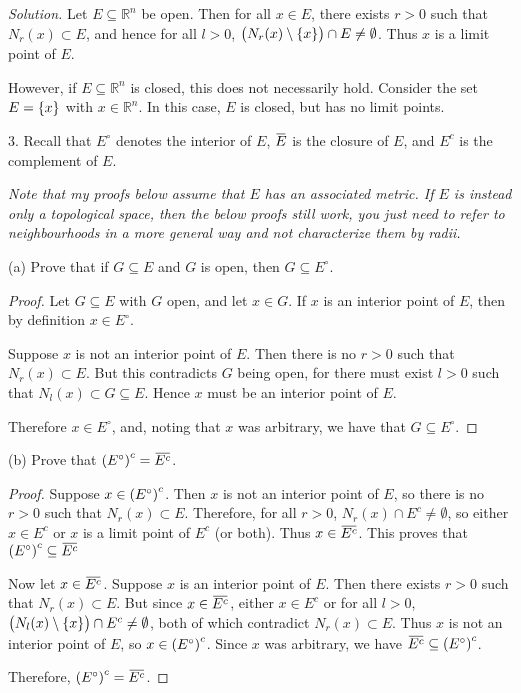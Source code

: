 \documentclass{article}
\newcommand{\R}{\mathbb{R}}
\newcommand*\clos[1]{\mkern 1.5mu\overline{\mkern-1.5mu#1\mkern-1.5mu}\mkern 1.5mu}
\begin{document}
\textit{Solution.}
Let $E \subseteq \R^n$ be open. Then for all $x \in E$, there exists $r
> 0$ such that $N_r(x) \subset E$, and hence for all $l > 0$,
$\del{N_r(x) \setminus \cbr{x}} \cap E \neq \emptyset$. Thus $x$ is a
limit point of $E$.

However, if $E \subseteq \R^n$ is closed, this does not necessarily
hold. Consider the set $E = \cbr{x}$ with $x \in \R^n$. In this case,
$E$ is closed, but has no limit points.

\newpage

3. Recall that $E^\circ$ denotes the interior of $E$, $\clos{E}$ is the
   closure of $E$, and $E^c$ is the complement of $E$.

\textit{Note that my proofs below assume that $E$ has an associated
metric. If $E$ is instead only a topological space, then the below
proofs still work, you just need to refer to neighbourhoods in a more
general way and not characterize them by radii.}

(a) Prove that if $G \subseteq E$ and $G$ is open, then $G \subseteq
E^\circ$.

\begin{proof}

Let $G \subseteq E$ with $G$ open, and let $x \in G$. If $x$ is an
interior point of $E$, then by definition $x \in E^\circ$.

Suppose $x$ is not an interior point of $E$. Then there is no $r > 0$
such that $N_r(x) \subset E$. But this contradicts $G$ being open, for
there must exist $l > 0$ such that $N_l(x) \subset G \subseteq E$. Hence
$x$ must be an interior point of $E$.

Therefore $x \in E^\circ$, and, noting that $x$ was arbitrary, we have
that $G \subseteq E^\circ$.

\end{proof}

(b) Prove that $\del{E^\circ}^c = \clos{E^c}$.

\begin{proof}

Suppose $x \in \del{E^\circ}^c$. Then $x$ is not an interior point of
$E$, so there is no $r > 0$ such that $N_r(x) \subset E$. Therefore, for
all $r > 0$, $N_r(x) \cap E^c \neq \emptyset$, so either $x \in E^c$ or
$x$ is a limit point of $E^c$ (or both). Thus $x \in \clos{E^c}$. This
proves that $\del{E^\circ}^c \subseteq \clos{E^c}$

Now let $x \in \clos{E^c}$. Suppose $x$ is an interior point of $E$.
Then there exists $r > 0$ such that $N_r(x) \subset E$. But since $x \in
\clos{E^c}$, either $x \in E^c$ or for all $l > 0$, $\del{N_l(x)
\setminus \cbr{x}} \cap E^c \neq \emptyset$, both of which contradict
$N_r(x) \subset E$. Thus $x$ is not an interior point of $E$, so $x \in
\del{E^\circ}^c$. Since $x$ was arbitrary, we have $\clos{E^c} \subseteq
\del{E^\circ}^c$.

Therefore, $\del{E^\circ}^c = \clos{E^c}$.

\end{proof}
\end{document}
